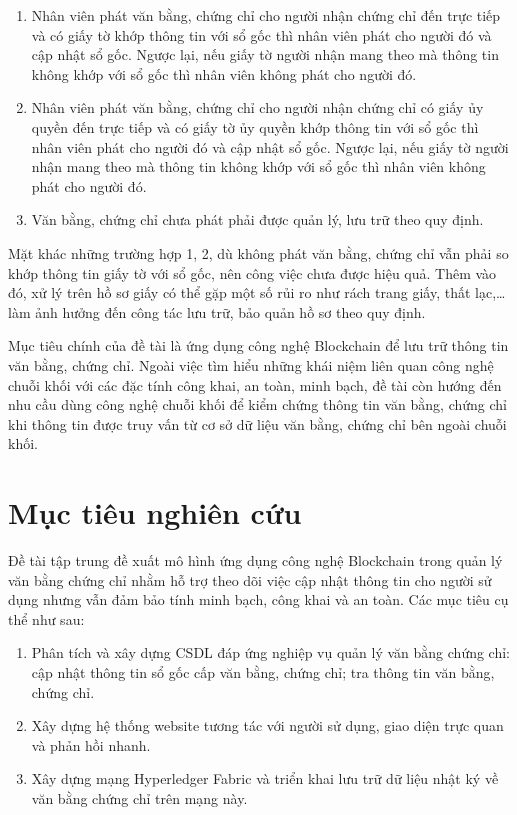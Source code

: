 \begin{enumerate}
\item Nhân viên phát văn bằng, chứng chỉ cho người nhận chứng chỉ đến trực tiếp và có giấy tờ khớp thông tin với sổ gốc thì nhân viên phát cho người đó và cập nhật sổ gốc. Ngược lại, nếu giấy tờ người nhận mang theo mà thông tin không khớp với sổ gốc thì nhân viên không phát cho người đó.

\item Nhân viên phát văn bằng, chứng chỉ cho người nhận chứng chỉ có giấy ủy quyền đến trực tiếp và có giấy tờ ủy quyền khớp thông tin với sổ gốc thì nhân viên phát cho người đó và cập nhật sổ gốc. Ngược lại, nếu giấy tờ người nhận mang theo mà thông tin không khớp với sổ gốc thì nhân viên không phát cho người đó.

\item Văn bằng, chứng chỉ chưa phát phải được quản lý, lưu trữ theo quy định.
\end{enumerate}

Mặt khác những trường hợp 1, 2, dù không phát văn bằng, chứng chỉ vẫn phải so khớp thông tin giấy tờ với sổ gốc, nên công việc chưa được hiệu quả. Thêm vào đó, xử lý trên hồ sơ giấy có thể gặp một số rủi ro như rách trang giấy, thất lạc,\ldots{} làm ảnh hưởng đến công tác lưu trữ, bảo quản hồ sơ theo quy định.

Mục tiêu chính của đề tài là ứng dụng công nghệ Blockchain để lưu trữ thông tin văn bằng, chứng chỉ. Ngoài việc tìm hiểu những khái niệm liên quan công nghệ chuỗi khối với các đặc tính công khai, an toàn, minh bạch, đề tài còn hướng đến nhu cầu dùng công nghệ chuỗi khối để kiểm chứng thông tin văn bằng, chứng chỉ khi thông tin được truy vấn từ cơ sở dữ liệu văn bằng, chứng chỉ bên ngoài chuỗi khối.

\section{Mục tiêu nghiên cứu}

Đề tài tập trung đề xuất mô hình ứng dụng công nghệ Blockchain trong quản lý văn bằng chứng chỉ nhằm hỗ trợ theo dõi việc cập nhật thông tin cho người sử dụng nhưng vẫn đảm bảo tính minh bạch, công khai và an toàn. Các mục tiêu cụ thể như sau:

\begin{enumerate}
\item Phân tích và xây dựng CSDL đáp ứng nghiệp vụ quản lý văn bằng chứng chỉ: cập nhật thông tin sổ gốc cấp văn bằng, chứng chỉ; tra thông tin văn bằng, chứng chỉ.
\item Xây dựng hệ thống website tương tác với người sử dụng, giao diện trực quan và phản hồi nhanh.
\item Xây dựng mạng Hyperledger Fabric và triển khai lưu trữ dữ liệu nhật ký về văn bằng chứng chỉ trên mạng này.
\end{enumerate}

